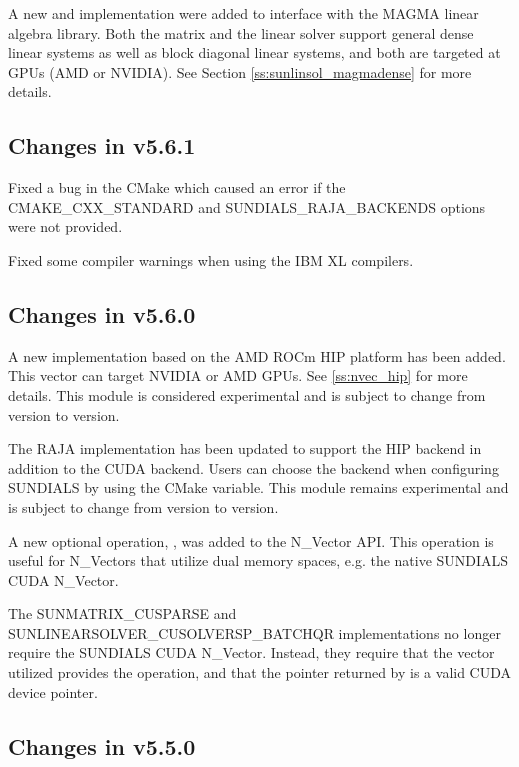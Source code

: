 A new {\sunmatrix} and {\sunlinsol} implementation were added to interface
with the MAGMA linear algebra library. Both the matrix and the linear solver
support general dense linear systems as well as block diagonal linear systems,
and both are targeted at GPUs (AMD or NVIDIA). See Section \ref{ss:sunlinsol_magmadense}
for more details.

\subsection*{Changes in v5.6.1}

Fixed a bug in the {\sundials} CMake which caused an error
if the CMAKE\_CXX\_STANDARD and SUNDIALS\_RAJA\_BACKENDS options
were not provided.

Fixed some compiler warnings when using the IBM XL compilers.

\subsection*{Changes in v5.6.0}

A new {\nvector} implementation based on the AMD ROCm HIP platform has been
added. This vector can target NVIDIA or AMD GPUs. See \ref{ss:nvec_hip} for more
details. This module is considered experimental and is subject to change from
version to version.

The RAJA {\nvector} implementation has been updated to support the HIP backend
in addition to the CUDA backend. Users can choose the backend when configuring
SUNDIALS by using the  CMake variable. This module
remains experimental and is subject to change from version to version.

A new optional operation, , was added to the N\_Vector
API. This operation is useful for N\_Vectors that utilize dual memory spaces,
e.g. the native SUNDIALS CUDA N\_Vector.

The SUNMATRIX\_CUSPARSE and SUNLINEARSOLVER\_CUSOLVERSP\_BATCHQR implementations
no longer require the SUNDIALS CUDA N\_Vector. Instead, they require that the vector
utilized provides the  operation, and that the pointer
returned by  is a valid CUDA device pointer.

\subsection*{Changes in v5.5.0}

